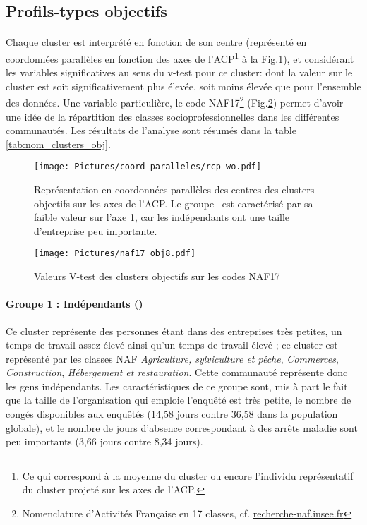 \documentclass[11pt,fleqn,openany,frenchb]{book} %
\begin{document}
 
\subsection{Profils-types objectifs}
\paragraph{}
Chaque cluster est interprété en fonction de son centre (représenté en coordonnées parallèles en fonction des  axes de l'ACP\footnote{Ce qui correspond à la moyenne du cluster ou encore l'individu représentatif du cluster projeté sur les axes de l'ACP.} à la  Fig.\ref{fig:CPobj}), et considérant les variables significatives au sens du v-test pour ce cluster: dont la valeur sur le cluster est soit significativement plus élevée, soit moins élevée que pour l'ensemble des données. Une variable particulière, le code NAF17\footnote{Nomenclature d'Activités Française en 17 classes, cf. \href{http://recherche-naf.insee.fr/SIRENET_Template/Accueil/template_page_accueil.html}{recherche-naf.insee.fr}} (Fig.\ref{fig:nafobj}) permet d'avoir une idée de la répartition des classes socioprofessionnelles dans les différentes communautés. Les résultats de l'analyse sont résumés dans la table \ref{tab:nom_clusters_obj}.


\begin{figure}[!h]
\centering
  \texttt{[image: Pictures/coord\_paralleles/rcp\_wo.pdf]}
\caption{Représentation en coordonnées parallèles des centres des clusters objectifs sur les axes de l'ACP. Le groupe \INDEP\ est caractérisé par sa faible valeur sur l'axe 1, car les indépendants ont une taille d'entreprise peu importante.}
\label{fig:CPobj}
\end{figure}

\begin{figure}[!h]
\centering
  \texttt{[image: Pictures/naf17\_obj8.pdf]}
\caption{Valeurs V-test des clusters objectifs sur les codes NAF17}
\label{fig:nafobj}
\end{figure}

\paragraph{Groupe 1 : Indépendants (\INDEP)\\}
Ce cluster représente des personnes étant dans des entreprises très petites, un temps de travail assez élevé ainsi qu'un temps de travail élevé ; ce cluster est représenté par les classes NAF \textit{Agriculture, sylviculture et pêche}, \textit{Commerces}, \textit{Construction}, \textit{Hébergement et restauration}. Cette communauté représente donc les gens indépendants. Les caractéristiques de ce groupe sont, mis à part le fait que la taille de l'organisation qui emploie l'enquêté est très petite, le nombre de congés disponibles aux enquêtés (14,58 jours contre 36,58 dans la population globale), et le nombre de jours d'absence correspondant à des arrêts maladie sont peu importants (3,66 jours contre 8,34 jours).
\end{document}
